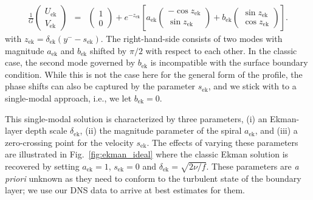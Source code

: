 \documentclass[smallcondensed,final]{svjour3}
\begin{document}
\begin{subequations}
  \label{eqn:profile_ekman}
  \begin{eqnarray}
    \frac{1}{G}\left(\begin{array}{c} 
      U_\mathrm{ek}\\ 
      V_\mathrm{ek}
    \end{array}\right)  &=& \left(\begin{array}{c} 1 \\ 0 \end{array}\right) 
    + e^{-z_\mathrm{ek}} \left[ a_\mathrm{ek}  \left(\begin{array}{r}
      -\cos z_\mathrm{ek} \\ 
      \sin z_\mathrm{ek}
      \end{array}\right)  + b_\mathrm{ek}\left(\begin{array}{r}
        \sin z_\mathrm{ek} \\ \cos z_\mathrm{ek}
        \end{array}\right)\right]. 
  \end{eqnarray}
\end{subequations}
with  $z_\mathrm{ek} = \delta_\mathrm{ek} (y^- -s_\mathrm{ek})$.
% 
The right-hand-side consists of two modes with magnitude $a_\mathrm{ek}$ and $b_\mathrm{ek}$
shifted by $\pi/2$ with respect to each other. 
%
In the classic case, the second mode governed by $b_\mathrm{ek}$ is incompatible with
the surface boundary condition. 
%
While this is not the case here for the general form of the profile, the
phase shifts can also be captured by the parameter $s_\mathrm{ek}$, 
and we stick with to a single-modal approach, i.e., we let $b_\mathrm{ek}=0$. 
%
\par 
%
This single-modal solution is characterized by three parameters,
(i) an Ekman-layer depth scale $\delta_\mathrm{ek}$,
(ii) the magnitude parameter of the spiral $a_\mathrm{ek}$, and
(iii) a zero-crossing point for the velocity $s_\mathrm{ek}$.
%
The effects of varying these parameters are illustrated in Fig.~\ref{fig:ekman_ideal} where
the classic Ekman solution is recovered by setting $a_\mathrm{ek}=1$, $s_\mathrm{ek}=0$ and
$\delta_\mathrm{ek}=\sqrt{2\nu/f}$.
% 
These parameters are \emph{a priori} unknown as they need to conform to the turbulent state of the
boundary layer; we use our DNS data to arrive at best estimates for them.
%
\par
%
\end{document}

